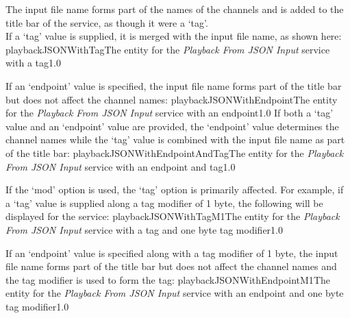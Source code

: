 The input file name forms part of the names of the channels and is added to the title bar
of the service, as though it were a `tag'.\\

If a `tag' value is supplied, it is merged with the input file name, as shown here:
%
{playbackJSONWithTag}{The \emph{\MMMU} entity for the \emph{Playback From JSON Input}
service with a tag}{1.0}

If an `endpoint' value is specified, the input file name forms part of the title bar but
does not affect the channel names:
%
{playbackJSONWithEndpoint}{The \emph{\MMMU} entity for the \emph{Playback From JSON Input}
service with an endpoint}{1.0}
\condPage{}
If both a `tag' value and an `endpoint' value are provided, the `endpoint' value
determines the channel names while the `tag' value is combined with the input file name
as part of the title bar:
%
{playbackJSONWithEndpointAndTag}{The \emph{\MMMU} entity for the \emph{Playback From JSON
Input} service with an endpoint and tag}{1.0}

If the `mod' option is used, the `tag' option is primarily affected.
For example, if a `tag' value is supplied along a tag modifier of 1 byte, the following
will be displayed for the service:
%
{playbackJSONWithTagM1}{The \emph{\MMMU} entity for the \emph{Playback From JSON Input}
service with a tag and one byte tag modifier}{1.0}

If an `endpoint' value is specified along with a tag modifier of 1 byte, the input file
name forms part of the title bar but does not affect the channel names and the tag
modifier is used to form the tag:
%
{playbackJSONWithEndpointM1}{The \emph{\MMMU} entity for the \emph{Playback From JSON
Input} service with an endpoint and one byte tag modifier}{1.0}

